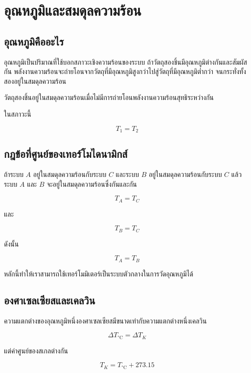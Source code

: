 \newpage{}

\section{อุณหภูมิและสมดุลความร้อน}

\subsection{อุณหภูมิคืออะไร}

อุณหภูมิเป็นปริมาณที่ใช้บอกสภาวะเชิงความร้อนของระบบ ถ้าวัตถุสองชิ้นมีอุณหภูมิต่างกันและสัมผัสกัน พลังงานความร้อนจะถ่ายโอนจากวัตถุที่มีอุณหภูมิสูงกว่าไปสู่วัตถุที่มีอุณหภูมิต่ำกว่า จนกระทั่งทั้งสองอยู่ในสมดุลความร้อน

\begin{tcolorbox}[title=สมดุลความร้อน]
วัตถุสองชิ้นอยู่ในสมดุลความร้อนเมื่อไม่มีการถ่ายโอนพลังงานความร้อนสุทธิระหว่างกัน

ในสภาวะนี้

\[
T_1=T_2
\]
\end{tcolorbox}

\subsection{กฎข้อที่ศูนย์ของเทอร์โมไดนามิกส์}

ถ้าระบบ $A$ อยู่ในสมดุลความร้อนกับระบบ $C$ และระบบ $B$ อยู่ในสมดุลความร้อนกับระบบ $C$ แล้วระบบ $A$ และ $B$ จะอยู่ในสมดุลความร้อนซึ่งกันและกัน

\[
T_A=T_C
\]

และ

\[
T_B=T_C
\]

ดังนั้น

\[
T_A=T_B
\]

หลักนี้ทำให้เราสามารถใช้เทอร์โมมิเตอร์เป็นระบบตัวกลางในการวัดอุณหภูมิได้

\subsection{องศาเซลเซียสและเคลวิน}

ความแตกต่างของอุณหภูมิหนึ่งองศาเซลเซียสมีขนาดเท่ากับความแตกต่างหนึ่งเคลวิน

\[
\Delta T_{\si{\degreeCelsius}}=\Delta T_{\si{K}}
\]

แต่ค่าศูนย์ของสเกลต่างกัน

\[
T_{\si{K}}=T_{\si{\degreeCelsius}}+273.15
\]

